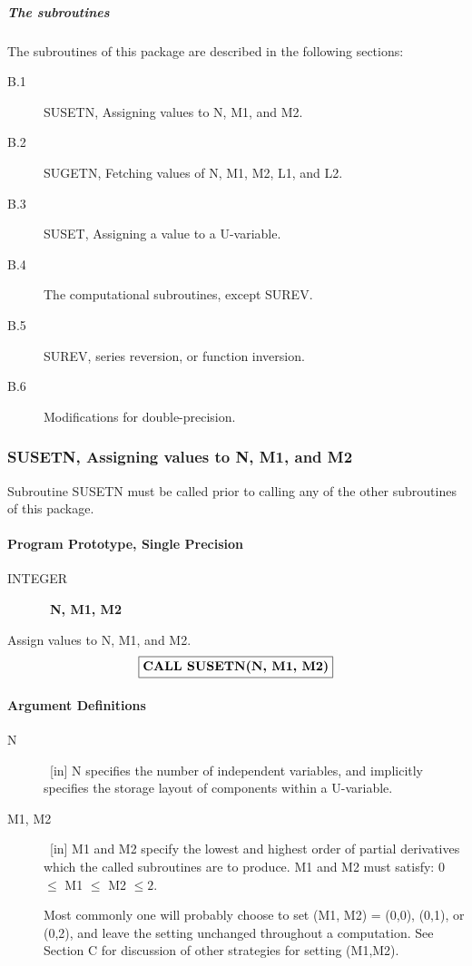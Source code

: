 \documentclass[twoside]{MATH77}
\begin{document}
\subparagraph{The subroutines}

The subroutines of this package are described in the following sections:

\begin{description}
\item[B.1]  SUSETN, Assigning values to N, M1, and M2.

\item[B.2]  SUGETN, Fetching values of N, M1, M2, L1, and L2.

\item[B.3]  SUSET, Assigning a value to a U-variable.

\item[B.4]  The computational subroutines, except SUREV.

\item[B.5]  SUREV, series reversion, or function inversion.

\item[B.6]  Modifications for double-precision.
\end{description}

\subsubsection{SUSETN, Assigning values to N, M1, and M2}

Subroutine SUSETN must be called prior to calling any of the other
subroutines of this package.

\paragraph{Program Prototype, Single Precision}
\begin{description}
\item[INTEGER]  \ {\bf N, M1, M2}
\end{description}

Assign values to N, M1, and M2.
$$
\fbox{{\bf CALL SUSETN(N, M1, M2)}}
$$

\paragraph{Argument Definitions}

\begin{description}

\item[N]  \ [in] N specifies the number of independent
variables, and implicitly specifies the storage layout of components within
a U-variable.

\item[M1, M2]  \ [in] M1 and M2 specify the lowest and highest order of partial derivatives
which the called subroutines are to produce.  M1 and M2 must satisfy:
 0 $\leq $ M1 $\leq $ M2 $\leq 2.$

Most commonly one will probably
choose to set (M1, M2) = (0,0), (0,1), or (0,2), and leave the setting
unchanged throughout a computation. See Section C for discussion of other
strategies for setting (M1,M2).
\end{description}
\end{document}
